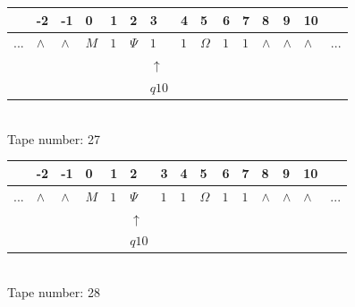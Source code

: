 \documentclass[11pt]{article}
\begin{document}
\begin{table}[H]
\centering
\begin{tabular}{lllllllllllllll}
 & -2 & -1 & 0 & 1 & 2 & 3 & 4 & 5 & 6 & 7 & 8 & 9 & 10 & \\
\hline
$...$ & \multicolumn{1}{|l|}{$\wedge$} & \multicolumn{1}{|l|}{$\wedge$} & \multicolumn{1}{|l|}{$M$} & \multicolumn{1}{|l|}{$1$} & \multicolumn{1}{|l|}{$\Psi$} & \multicolumn{1}{|l|}{$1$} & \multicolumn{1}{|l|}{$1$} & \multicolumn{1}{|l|}{$\Omega$} & \multicolumn{1}{|l|}{$1$} & \multicolumn{1}{|l|}{$1$} & \multicolumn{1}{|l|}{$\wedge$} & \multicolumn{1}{|l|}{$\wedge$} & \multicolumn{1}{|l|}{$\wedge$} & $...$\\
\hline
&  &  &  &  &  & $\uparrow$ &  &  &  &  &  &  &  &  \\
&  &  &  &  &  & $ q10 $ &  &  &  &  &  &  &  &  \\
\end{tabular}
\\
Tape number: 27
\noindent\makebox[\linewidth]{\hdashrule{\textwidth}{1pt}{1pt}}\end{table}

\begin{table}[H]
\centering
\begin{tabular}{lllllllllllllll}
 & -2 & -1 & 0 & 1 & 2 & 3 & 4 & 5 & 6 & 7 & 8 & 9 & 10 & \\
\hline
$...$ & \multicolumn{1}{|l|}{$\wedge$} & \multicolumn{1}{|l|}{$\wedge$} & \multicolumn{1}{|l|}{$M$} & \multicolumn{1}{|l|}{$1$} & \multicolumn{1}{|l|}{$\Psi$} & \multicolumn{1}{|l|}{$1$} & \multicolumn{1}{|l|}{$1$} & \multicolumn{1}{|l|}{$\Omega$} & \multicolumn{1}{|l|}{$1$} & \multicolumn{1}{|l|}{$1$} & \multicolumn{1}{|l|}{$\wedge$} & \multicolumn{1}{|l|}{$\wedge$} & \multicolumn{1}{|l|}{$\wedge$} & $...$\\
\hline
&  &  &  &  & $\uparrow$ &  &  &  &  &  &  &  &  &  \\
&  &  &  &  & $ q10 $ &  &  &  &  &  &  &  &  &  \\
\end{tabular}
\\
Tape number: 28
\noindent\makebox[\linewidth]{\hdashrule{\textwidth}{1pt}{1pt}}\end{table}
\end{document}
